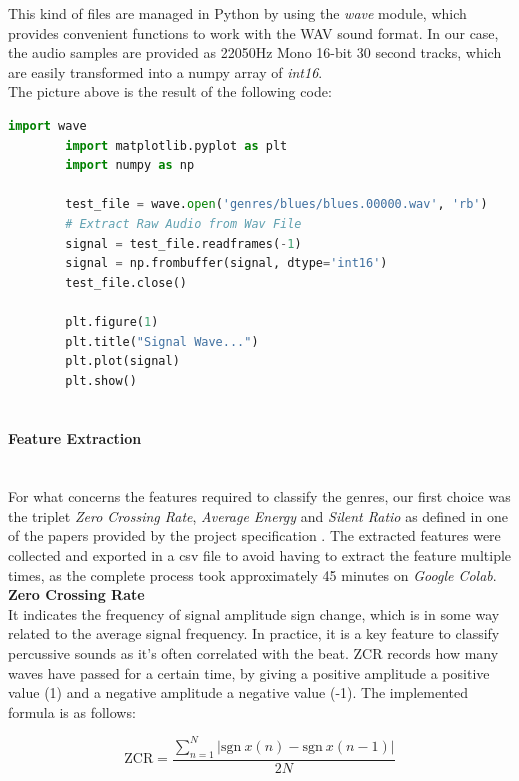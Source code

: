 \documentclass[12pt]{article}
\begin{document}
	
	This kind of files are managed in Python by using the \textit{wave} module, which provides convenient functions to work with the WAV sound format. In our case, the audio samples are provided as 22050Hz Mono 16-bit 30 second tracks\cite{marsyas}, which are easily transformed into a numpy array of \textit{int16}.\\
	The picture above is the result of the following code:
	\begin{lstlisting}[language=Python]
		import wave
		import matplotlib.pyplot as plt
		import numpy as np
		
		test_file = wave.open('genres/blues/blues.00000.wav', 'rb')
		# Extract Raw Audio from Wav File
		signal = test_file.readframes(-1)
		signal = np.frombuffer(signal, dtype='int16')
		test_file.close()
		
		plt.figure(1)
		plt.title("Signal Wave...")
		plt.plot(signal)
		plt.show()
		
	\end{lstlisting}
	\newpage
	
	\paragraph{Feature Extraction}\mbox{}\\\newline
	For what concerns the features required to classify the genres, our first choice was the triplet \textit{Zero Crossing Rate}, \textit{Average Energy} and \textit{Silent Ratio} as defined in one of the papers provided by the project specification \cite{comparison}. The extracted features were collected and exported in a csv file to avoid having to extract the feature multiple times, as the complete process took approximately 45 minutes on \textit{Google Colab}.\\
	
	\textbf{Zero Crossing Rate}\\
	It indicates the frequency of signal amplitude sign change, which is in some way related to the average signal frequency. In practice, it is a key feature to classify percussive sounds as it's often correlated with the beat. ZCR records how many waves have passed for a certain time, by giving a positive amplitude a positive value (1) and a negative amplitude a negative value (-1). The implemented formula is as follows:
	
	\begin{equation}
		\text{ZCR}=\dfrac{\sum_{n=1}^N{\bigg|\text{sgn}\ x(n)-\text{sgn}\ x(n-1)\bigg|}}{2N}
	\end{equation}
	
\end{document}
